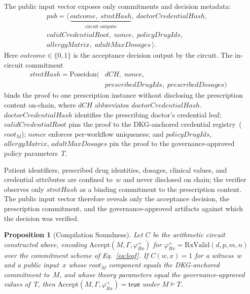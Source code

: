 \documentclass[journal]{IEEEtran}
\newtheorem{proposition}[definition]{Proposition}
\begin{document}
The public input vector exposes only commitments and decision
metadata:
\begin{equation}
\begin{split}
\mathit{pub} = \langle\,
\underbrace{\mathit{outcome},\;\mathit{stmtHash}}_{\text{circuit outputs}},\;
\mathit{doctorCredentialHash},\; \\
\mathit{validCredentialRoot},\;
\mathit{nonce},\;
\mathit{policyDrugIds},\; \\
\mathit{allergyMatrix},\;
\mathit{adultMaxDosages}
\,\rangle.
\end{split}
\label{eq:public-inputs}
\end{equation}
Here $\mathit{outcome}\in\{0,1\}$ is the acceptance decision
output by the circuit. The in-circuit commitment
\begin{equation}
\begin{split}
\mathit{stmtHash} = \mathrm{Poseidon}(&\mathit{dCH},\;\mathit{nonce},\\
&\mathit{prescribedDrugIds},\;\mathit{prescribedDosages})
\end{split}
\label{eq:stmthash-def}
\end{equation}
binds the proof to one prescription instance without disclosing
the prescription content on-chain, where $\mathit{dCH}$ abbreviates
$\mathit{doctorCredentialHash}$.
$\mathit{doctorCredentialHash}$ identifies the prescribing
doctor's credential leaf;
$\mathit{validCredentialRoot}$ pins the proof to the DKG-anchored
credential registry~($\mathit{root}_M$);
$\mathit{nonce}$ enforces per-workflow uniqueness; and
$\mathit{policyDrugIds}$, $\mathit{allergyMatrix}$,
$\mathit{adultMaxDosages}$ pin the proof to the
governance-approved policy parameters~$T$.


Patient identifiers, prescribed drug identities, dosages,
clinical values, and credential attributes are confined
to~$w$ and never disclosed on chain; the verifier observes
only $\mathit{stmtHash}$ as a binding commitment to the
prescription content. The public input vector therefore
reveals only the acceptance decision, the prescription
commitment, and the governance-approved artifacts against
which the decision was verified.



\begin{proposition}[Compilation Soundness]
\label{prop:compile-soundness}
Let $C$ be the arithmetic circuit constructed above, encoding
$\mathrm{Accept}(M,\Gamma,\varphi^{+}_{Rx})$ for
$\varphi^{+}_{Rx}=\mathrm{RxValid}(d,p,m,n)$ over the
commitment scheme of Eq.~\ref{eq:leaf}.
If $C(w,x)=1$ for a witness~$w$ and a public input~$x$ whose
$\mathit{root}_M$ component equals the DKG-anchored
commitment to~$M$, and whose theory parameters equal the
governance-approved values of~$T$,
then
$\mathrm{Accept}(M,\Gamma,\varphi^{+}_{Rx})=\mathsf{true}$
under $M \models T$.
\end{proposition}
\end{document}
